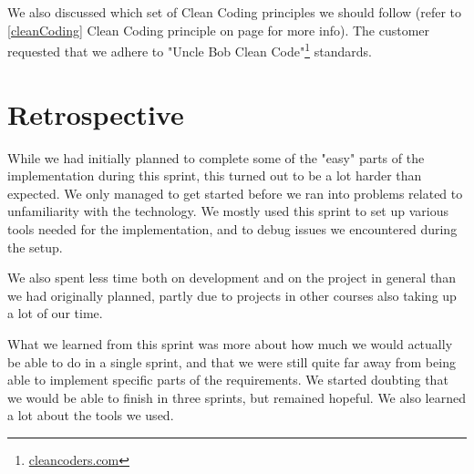 We also discussed which set of Clean Coding principles we should follow (refer to \ref{cleanCoding} Clean Coding principle on page \pageref{cleanCoding} for more info). The customer requested that we adhere to "Uncle Bob Clean Code"\footnote{\href{http://cleancoders.com}{cleancoders.com}} standards.

\section{Retrospective}
While we had initially planned to complete some of the "easy" parts of the implementation during this sprint, this turned out to be a lot harder than expected. We only managed to get started before we ran into problems related to unfamiliarity with the technology. We mostly used this sprint to set up various tools needed for the implementation, and to debug issues we encountered during the setup.

We also spent less time both on development and on the project in general than we had originally planned, partly due to projects in other courses also taking up a lot of our time.

What we learned from this sprint was more about how much we would actually be able to do in a single sprint, and that we were still quite far away from being able to implement specific parts of the requirements. We started doubting that we would be able to finish in three sprints, but remained hopeful. We also learned a lot about the tools we used.
